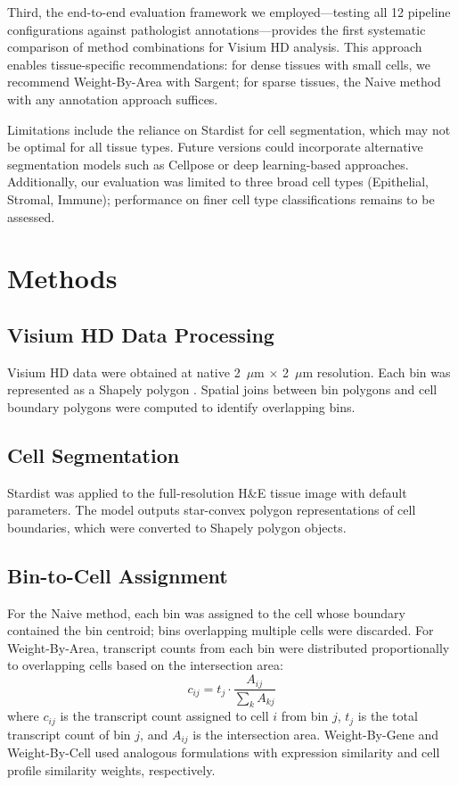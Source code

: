 \documentclass[11pt]{article}
\begin{document}
Third, the end-to-end evaluation framework we employed---testing all 12 pipeline configurations against pathologist annotations---provides the first systematic comparison of method combinations for Visium HD analysis. This approach enables tissue-specific recommendations: for dense tissues with small cells, we recommend Weight-By-Area with Sargent; for sparse tissues, the Naive method with any annotation approach suffices.

Limitations include the reliance on Stardist for cell segmentation, which may not be optimal for all tissue types. Future versions could incorporate alternative segmentation models such as Cellpose or deep learning-based approaches. Additionally, our evaluation was limited to three broad cell types (Epithelial, Stromal, Immune); performance on finer cell type classifications remains to be assessed.

\section{Methods}

\subsection{Visium HD Data Processing}

Visium HD data were obtained at native 2~$\mu$m $\times$ 2~$\mu$m resolution. Each bin was represented as a Shapely polygon \citep{shapely2023}. Spatial joins between bin polygons and cell boundary polygons were computed to identify overlapping bins.

\subsection{Cell Segmentation}

Stardist \citep{schmidt2018stardist, weigert2020stardist} was applied to the full-resolution H\&E tissue image with default parameters. The model outputs star-convex polygon representations of cell boundaries, which were converted to Shapely polygon objects.

\subsection{Bin-to-Cell Assignment}

For the Naive method, each bin was assigned to the cell whose boundary contained the bin centroid; bins overlapping multiple cells were discarded. For Weight-By-Area, transcript counts from each bin were distributed proportionally to overlapping cells based on the intersection area:
\begin{equation}
c_{ij} = t_j \cdot \frac{A_{ij}}{\sum_k A_{kj}}
\end{equation}
where $c_{ij}$ is the transcript count assigned to cell $i$ from bin $j$, $t_j$ is the total transcript count of bin $j$, and $A_{ij}$ is the intersection area. Weight-By-Gene and Weight-By-Cell used analogous formulations with expression similarity and cell profile similarity weights, respectively.
\end{document}
